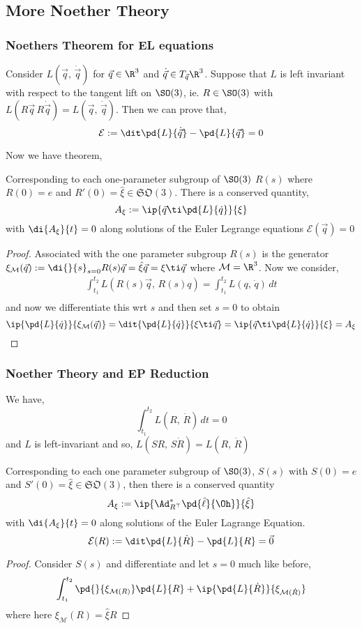 
\subsection{More Noether Theory}

\subsubsection{Noethers Theorem for EL equations}

Consider $L(\vec q,\, \dot{\vec q})$ for $\vec q \in \R^3$ and $\dot{\vec q} \in T_{\vec q}\R^3$. Suppose that $L$ is left invariant with respect to the tangent lift on $\SO(3)$, ie. $R\in\SO(3)$ with $L(R\vec q\, R\dot{\vec q}) = L(\vec q,\,\dot{\vec q})$. Then we can prove that,
$$ \mathcal{E} := \dit \pd{L}{\dot{\vec q}} - \pd{L}{\vec q} = 0 $$

Now we have theorem,
\begin{nthm}
  Corresponding to each one-parameter subgroup of $\SO(3)$ $R(s)$ where $R(0) = e$ and $R'(0) = \hat\xi \in \mathfrak{SO}(3)$. There is a conserved quantity,
  $$ A_\xi := \ip{\vec q \ti \pd{L}{\dot q}}{\xi} $$
  with $\di{A_\xi}{t} = 0$ along solutions of the Euler Legrange equations $\mathcal{E}(\vec q) = 0$
\end{nthm}
\begin{proof}
  Associated with the one parameter subgroup $R(s)$ is the generator $\xi_{\mathcal{M}}(\vec q) := \di{}{s}_{s=0} R(s)\vec q = \hat\xi \vec q = \xi\ti\vec q$ where $\mathcal{M} = \R^3$. Now we consider,
  \begin{align*}
    \int_{t_1}^{t_2} L(R(s)\vec q,\,R(s)q) = \int_{t_1}^{t_2} L(q,\,\dot q) \,dt \\
  \end{align*}
  and now we differentiate this wrt $s$ and then set $s = 0$ to obtain
  $$ \ip{\pd{L}{\dot q}}{\xi_{\mathcal{M}}(\vec q)} = \dit{\pd{L}{\dot q}}{\xi \ti \vec q} = \ip{\vec q \ti \pd{L}{\dot q}}{\xi} = A_\xi$$
\end{proof}

\subsubsection{Noether Theory and EP Reduction}
We have,
$$ \int_{t_1}^{t_2} L(R,\,\dot R)\,dt = 0 $$
and $L$ is left-invariant and so, $L(SR,\,S\dot R) = L(R,\,\dot R)$
\begin{nthm}
  Corresponding to each one parameter subgroup of $\SO(3)$, $S(s)$ with $S(0)= e$ and $S'(0) = \hat\xi \in \mathfrak{SO}(3)$, then there is a conserved quantity
  $$ A_\xi := \ip{\Ad^*_{R^\top}\pd{\hat\ell}{\Oh}}{\hat\xi} $$
  with $\di{A_\xi}{t} = 0$ along solutions of the Euler Lagrange Equation.
  $$ \mathcal{E}(R) := \dit\pd{L}{\dot R} - \pd{L}{R} = \vec 0 $$
\end{nthm}
\begin{proof}
  Consider $S(s)$ and differentiate and let $s = 0$ much like before,
  $$ \int_{t_1}^{t_2} \pd{}{\xi_{\mathcal{M}(R)}}\pd{L}{R} + \ip{\pd{L}{\dot R}}{\xi_{\mathcal{M}(\dot R)}} $$
  where here $\xi_{\mathcal{M}}(R) = \hat\xi R$
\end{proof}



